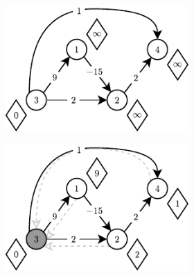 \begin{figure}[!htbp]
	\centering
	\begin{subfigure}[b]{\textwidth}
		\null\hfill
		\begin{subfigure}[b]{0.31\textwidth}
			\includegraphics[width=\textwidth]{Chapter_II/DIJKSTRA-NegativeArc/a.pdf}
			\caption{}
			\label{fig:exapleDijkstraNegativArc:a}
		\end{subfigure}
		\hfill
		\begin{subfigure}[b]{0.31\textwidth}
			\includegraphics[width=\textwidth]{Chapter_II/DIJKSTRA-NegativeArc/b.pdf}
			\caption{}
			\label{fig:exapleDijkstraNegativArc:b}
		\end{subfigure}
		\hfill
		\begin{subfigure}[b]{0.31\textwidth}

\end{subfigure}
\end{subfigure}
\end{figure}
